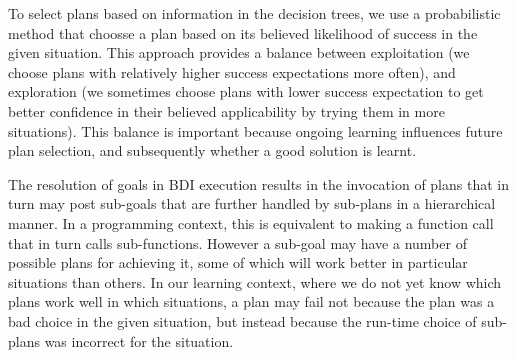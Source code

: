 To select plans based on information in the decision trees, we use a
probabilistic method that choosse a plan based on its believed likelihood of success in the
given situation. This approach provides a balance between
exploitation (we choose plans with relatively higher success expectations
more often), and exploration (we sometimes choose plans with lower
success expectation to get better
confidence in their believed applicability by trying them in more 
situations).
%
This balance is important because ongoing learning influences future plan selection, and subsequently whether a good solution is learnt.


The resolution of goals in BDI execution results in 
the invocation of plans that in turn may post sub-goals that are further
handled by sub-plans in a hierarchical manner. In a programming context,
this is equivalent to making a function call that in turn calls sub-functions.
However a sub-goal may have a number of possible plans for achieving
it, some of which will work better in particular situations than
others. In our learning context, where we do not yet know which plans
work well in which situations, a plan may fail not because the plan
was a bad choice in the given situation, but instead because the
run-time choice of sub-plans was incorrect for the situation.


